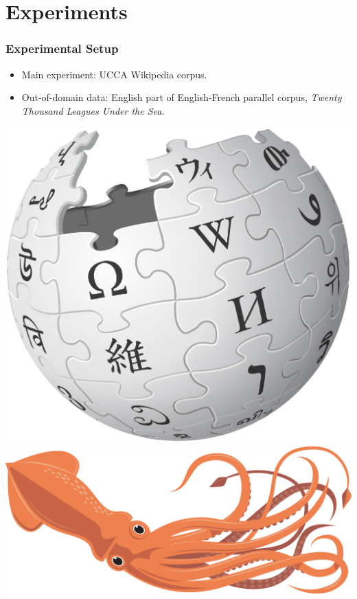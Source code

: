 \documentclass[t]{beamer}
\begin{document}
\section{Experiments}

\begin{frame}
\frametitle{Experimental Setup}
\begin{itemize}
 \item Main experiment: UCCA Wikipedia corpus.
 \item Out-of-domain data: English part of English-French parallel corpus,
 	\textit{Twenty Thousand Leagues Under the Sea}.
\end{itemize}

\vfill
\begin{center}
  \includegraphics[width=.5\linewidth]{wikipedia.png}
  \includegraphics[width=.5\linewidth]{squid.jpg}
\end{center}
\end{frame}
\end{document}
